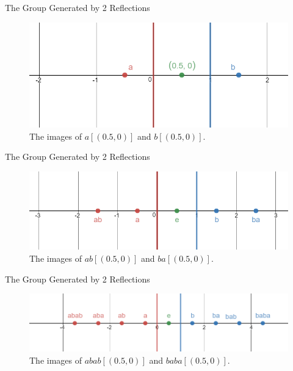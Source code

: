 \documentclass[usenames,dvipsnames]{beamer}
\begin{document}
\begin{frame}{The Group Generated by 2 Reflections}

\begin{figure}[h]
    \centering
    \includegraphics[width=1\textwidth]{images/1-02-d_inf_a_b.png}
    \caption{The images of $a[(0.5,0)]$ and $b[(0.5,0)]$.}
\end{figure}

\end{frame}

\begin{frame}{The Group Generated by 2 Reflections}

\begin{figure}[h]
    \centering
    \includegraphics[width=1\textwidth]{images/1-04-d_inf_ab_1.png}
    \caption{The images of $ab[(0.5,0)]$ and $ba[(0.5,0)]$.}
\end{figure}

\end{frame}

\begin{frame}{The Group Generated by 2 Reflections}

\begin{figure}[h]
    \centering
    \includegraphics[width=1\textwidth]{images/1-05-d_inf_ab_2.png}
    \caption{The images of $abab[(0.5,0)]$ and $baba[(0.5,0)]$.}
\end{figure}

\end{frame}
\end{document}
